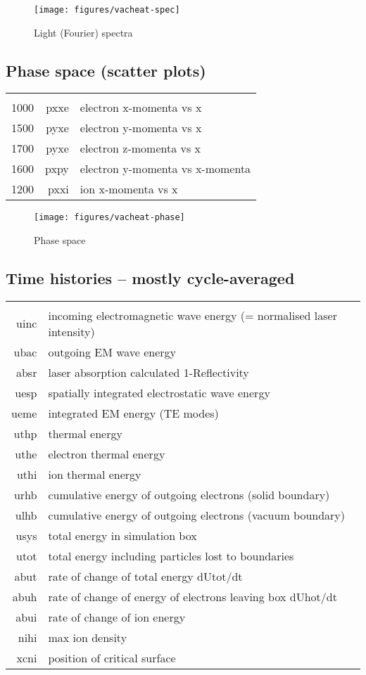 \documentclass[11pt]{article}
\begin{document}
\begin{figure}[ht]
\begin{center}
\texttt{[image: figures/vacheat-spec]}
\caption{Light (Fourier) spectra}
\end{center}
\end{figure}

\subsection{Phase space (scatter plots)} 
\begin{tabular}{rrl}
\hline\\ 
1000 &pxxe& electron x-momenta vs x\\ 
1500 & pyxe& electron y-momenta vs x \\
1700 & pyxe& electron z-momenta vs x \\
1600 & pxpy& electron y-momenta vs x-momenta \\
1200 & pxxi& ion x-momenta vs x
\end{tabular}

\begin{figure}[ht]
\begin{center}
\texttt{[image: figures/vacheat-phase]}
\caption{Phase space}
\end{center}
\end{figure}

\subsection{Time histories -- mostly cycle-averaged} 
\begin{tabular}{rl}
\hline\\ 
uinc& incoming electromagnetic wave energy (= normalised laser intensity) \\
ubac& outgoing EM wave energy \\
absr& laser absorption calculated 1-Reflectivity\\ 
uesp& spatially integrated electrostatic wave energy\\ 
ueme& integrated EM energy (TE modes) \\
uthp& thermal energy \\
uthe& electron thermal energy \\
uthi& ion thermal energy \\
urhb& cumulative energy of outgoing electrons (solid boundary)\\ 
ulhb& cumulative energy of outgoing electrons (vacuum boundary) \\
usys& total energy in simulation box \\
utot& total energy including particles lost to boundaries \\
abut& rate of change of total energy dUtot/dt \\
abuh& rate of change of energy of electrons leaving box dUhot/dt \\
abui& rate of change of ion energy \\
nihi& max ion density \\
xcni& position of critical surface 
\end{tabular}
\end{document}
